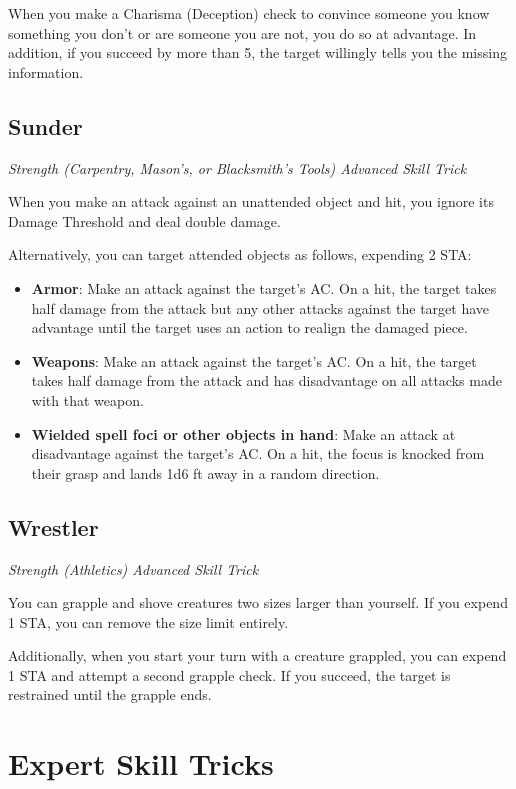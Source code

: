 When you make a Charisma (Deception) check to convince someone you know something you don't or are someone you are not, you do so at advantage. In addition, if you succeed by more than 5, the target willingly tells you the missing information.

\subsection{Sunder}

\textit{Strength (Carpentry, Mason's, or Blacksmith's Tools) Advanced Skill Trick}

When you make an attack against an unattended object and hit, you ignore its Damage Threshold and deal double damage. 

Alternatively, you can target attended objects as follows, expending 2 STA:
\begin{itemize}
	\item \textbf{Armor}: Make an attack against the target's AC. On a hit, the target takes half damage from the attack but any other attacks against the target have advantage until the target uses an action to realign the damaged piece.
	\item \textbf{Weapons}: Make an attack against the target's AC. On a hit, the target takes half damage from the attack and has disadvantage on all attacks made with that weapon.
	\item \textbf{Wielded spell foci or other objects in hand}: Make an attack at disadvantage against the target's AC. On a hit, the focus is knocked from their grasp and lands 1d6  ft away in a random direction.
\end{itemize}

\subsection{Wrestler}

\textit{Strength (Athletics) Advanced Skill Trick}

You can grapple and shove creatures two sizes larger than yourself. If you expend 1 STA, you can remove the size limit entirely.

Additionally, when you start your turn with a creature grappled, you can expend 1 STA and attempt a second grapple check. If you succeed, the target is restrained until the grapple ends.

\section{Expert Skill Tricks}
\label{sec:skill-tricks-expert}

